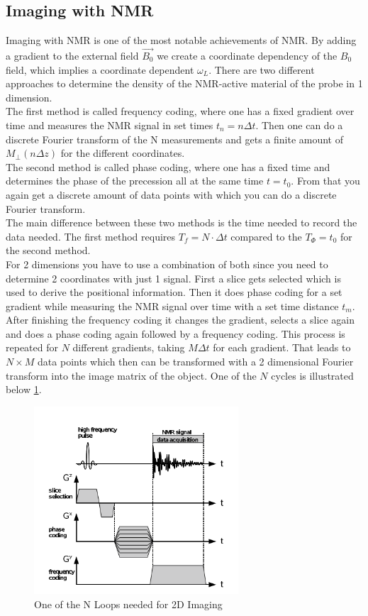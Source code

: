 \subsection{Imaging with NMR}\label{imagening}
Imaging with NMR is one of the most notable achievements of NMR. By adding a gradient to the external field $\vec{B_0}$ we create a coordinate dependency of the $B_0$ field, which implies a coordinate dependent $\omega_L$. There are two different approaches to determine the density of the NMR-active material of the probe in 1 dimension.
\vspace{2mm}\\
The first method is called frequency coding, where one has a fixed gradient over time and measures the  NMR signal in set times $t_n = n \Delta t$. Then one can do a discrete Fourier transform of the N measurements and gets a finite amount of $M_{\perp}(n \Delta z)$ for the different coordinates. 
\vspace{2mm}\\
The second method is called phase coding, where one has a fixed time and determines the phase of the precession all at the same time $t = t_0$. From that you again get a discrete amount of data points with which you can do a discrete Fourier transform. 
\vspace{2mm}\\
The main difference between these two methods is the time needed to record the data needed. The first method requires $T_f = N \cdot \Delta t$ compared to the $T_{\Phi} = t_0$ for the second method.
\vspace{3mm}\\
For 2 dimensions you have to use a combination of both since you need to determine 2 coordinates with just 1 signal. First a slice gets selected which is used to derive the positional information. Then it does phase coding for a set gradient while measuring the NMR signal over time with a set time distance $t_m$. After finishing the frequency coding it changes the gradient, selects a slice again and does a phase coding again followed by a frequency coding. This process is repeated for $N$ different gradients, taking $M \Delta t$ for each gradient. That leads to$ N \times M$ data points which then can be transformed with a 2 dimensional Fourier transform into the image matrix of the object. One of the $N$ cycles is illustrated below \ref{2dfourier}.\\
\begin{figure}[h]
	\centering
	\includegraphics[width=0.7\linewidth ,height=7cm]{images/2d_fourier.png}
	\caption{One of the N Loops needed for 2D Imaging}
	\label{2dfourier}
\end{figure}